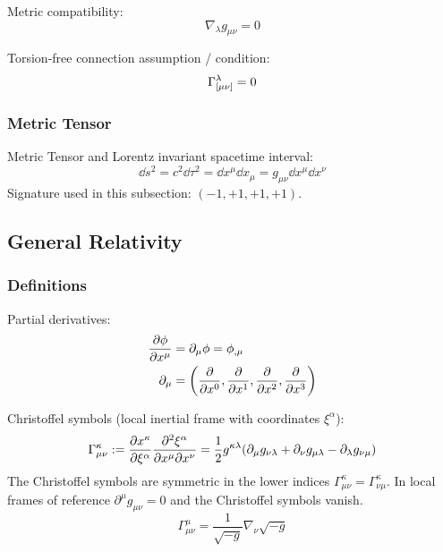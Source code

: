 			\noindent
			Metric compatibility:
			\begin{equation}
				\nabla_\lambda g_{\mu\nu} = 0
			\end{equation}

			\noindent
			Torsion-free connection assumption / condition:
			\begin{equation}
				\Gamma^{\lambda}_{\qty[\mu\nu]} = 0
			\end{equation}

		\subsubsection{Metric Tensor}
			Metric Tensor and Lorentz invariant spacetime interval:
			\begin{equation}
				\dd s^2 = c^2 \dd \tau^2 = \dd x^\mu \dd x_\mu = g_{\mu\nu} \dd x^\mu \dd x^\nu
			\end{equation}
			Signature used in this subsection: $(-1,+1,+1,+1)$.

	\subsection{General Relativity}
		\subsubsection{Definitions}
			\noindent
			Partial derivatives:
			\begin{equation}
				\begin{aligned}
					\pdv{\phi}{x^\mu} &= \partial_\mu \phi = \phi_{,\mu} \\
					\partial_\mu &= \qty(\pdv{x^0}, \pdv{x^1}, \pdv{x^2}, \pdv{x^3}) \\
				\end{aligned}
			\end{equation}

			\noindent
			Christoffel symbols (local inertial frame with coordinates $\xi^\alpha$):
			\begin{equation}
				\Gamma_{\mu\nu}^{\kappa} := \frac{\partial x^\kappa}{\partial \xi^\alpha}\frac{\partial^2 \xi^\alpha}{\partial x^\mu\partial x^\nu}
				=\frac{1}{2}g^{\kappa\lambda}\qty(\partial_\mu g_{\nu\lambda} + \partial_\nu g_{\mu\lambda} - \partial_\lambda g_{\nu\mu})
			\end{equation}
			The Christoffel symbols are symmetric in the lower indices $\Gamma_{\mu\nu}^{\kappa} = \Gamma_{\nu\mu}^{\kappa}$. In local frames of reference $\partial^\mu g_{\mu\nu} = 0$ and the Christoffel symbols vanish.
			\begin{equation}
				\Gamma^\mu_{\mu\nu} = \frac{1}{\sqrt{-g}}\nabla_\nu \sqrt{-g}
			\end{equation}

